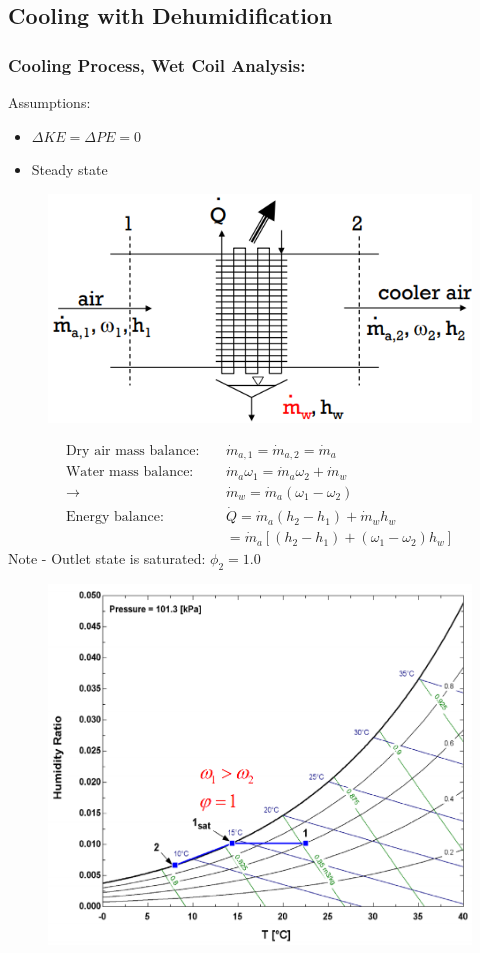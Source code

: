 \documentclass[class=report, crop=false, 12pt,a4paper]{standalone}
\numberwithin{equation}{section}
\begin{document}
\subsection*{Cooling with Dehumidification}
\subsubsection{Cooling Process, Wet Coil Analysis:}
Assumptions:
\begin{itemize}[noitemsep]
  \item $\Delta KE = \Delta PE = 0$
  \item Steady state
\end{itemize}
\begin{figure}[H]
  \centering
  \includegraphics[width = 0.5 \textwidth]{../img/diagram113.png}
  \caption{}
\end{figure}
\begin{align}
  \text{Dry air mass balance:} \ \ \ \ \ &\dot{m}_{a,1} = \dot{m}_{a,2} = \dot{m}_{a} \\[5pt]
  \text{Water mass balance:} \ \ \ \ \ &\dot{m}_{a}\omega_1 = \dot{m}_{a}\omega_2 + \dot{m}_{w} \\[5pt]
  \longrightarrow \ \ &\dot{m}_{w} = \dot{m}_{a}(\omega_1-\omega_2)\\[5pt]
  \text{Energy balance:} \ \ \ \ \ &\dot{Q} = \dot{m}_{a}(h_2-h_1) + \dot{m}_{w}h_{w} \\[5pt]
  &= \dot{m}_{a}\left[(h_2-h_1) + (\omega_1-\omega_2)h_{w}\right]
\end{align}
Note - Outlet state is saturated: $\phi_2 = 1.0$
\begin{figure}[H]
  \centering
  \includegraphics[width = 0.7 \textwidth]{../img/diagram114.png}
  \caption{}
\end{figure}
\end{document}
